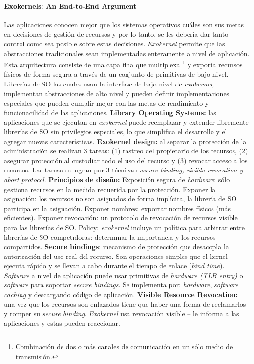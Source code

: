\paragraph{\textnormal{\textbf{Exokernels: An End-to-End Argument}}}
Las aplicaciones conocen mejor que los sistemas operativos cuáles son sus metas en decisiones de gestión de recursos y por lo tanto, se les debería dar tanto control como sea posible sobre estas decisiones. \textit{Exokernel} permite que las abstracciones tradicionales sean implementadas enteramente a nivel de aplicación. Esta arquitectura consiste de una capa fina que multiplexa  \footnote{Combinación de dos o más canales de comunicación en un sólo medio de transmisión.} y exporta recursos físicos de forma segura a través de un conjunto de primitivas de bajo nivel. Librerías de SO las cuales usan la interfase de bajo nivel de \textit{exokernel}, implementan abstracciones de alto nivel y pueden definir implementaciones especiales que pueden cumplir mejor con las metas de rendimiento y funcionacilidad de las aplicaciones. \textbf{Library Operating Systems:} las aplicaciones que se ejecutan en \textit{exokernel} puede reemplazar y extender libremente librerías de SO sin privilegios especiales, lo que simplifica el desarrollo y el agregar nuevas características. \textbf{Exokernel design:} al separar la protección de la administración se realizan 3 tareas: (1) rastreo del propietario de los recursos, (2) asegurar protección al custodiar todo el uso del recurso y (3) revocar acceso a los recursos. Las tareas se logran por 3 técnicas: \textit{secure binding, visible revocation \textnormal{y} abort protocol}. \textbf{Principios de diseño:} Exposición segura de \textit{hardware}: sólo gestiona recursos en la medida requerida por la protección. Exponer la asignación: los recursos no son asignados de forma implícita, la librería de SO participa en la asignación. Exponer nombres: exportar nombres físicos (más eficientes). Exponer revocación: un protocolo de revocación de recursos visible para las librerías de SO. \underline{Policy}: \textit{exokernel} incluye un política para arbitrar entre librerías de SO competidoras: determinar la importancia y los recursos compartidos. \textbf{Secure bindings}: mecanismo de protección que desacopla la autorización del uso real del recurso. Son operaciones simples que el kernel ejecuta rápido y se llevan a cabo durante el tiempo de enlace (\textit{bind time}). \textit{Software} a nivel de aplicación puede usar primitivas de \textit{hardware (TLB entry)} o \textit{software} para soportar \textit{secure bindings}. Se implementa por: \textit{hardware}, \textit{software caching} y descargando código de aplicación. \textbf{Visible Resource Revocation:} una vez que los recursos son enlazados tiene que haber una forma de reclamarlos y romper su \textit{secure binding}. \textit{Exokernel} usa revocación visible -- le informa a las aplicaciones y estas pueden reaccionar.
 

